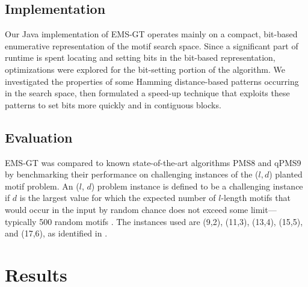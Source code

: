 \documentclass[conference]{IEEEtran}
\begin{document}
	\subsection{Implementation}
		Our Java implementation of EMS-GT operates mainly on a compact, bit-based enumerative representation of the motif search space. Since a significant part of runtime is spent locating and setting bits in the bit-based representation, optimizations were explored for the bit-setting portion of the algorithm. We investigated the properties of some Hamming distance-based patterns occurring in the search space, then formulated a speed-up technique that exploits these patterns to set bits more quickly and in contiguous blocks.

	\subsection{Evaluation}
		EMS-GT was compared to known state-of-the-art algorithms PMS8 and qPMS9 by benchmarking their performance on challenging instances of the ($l, d$) planted motif problem. An ($l$, $d$) problem instance is defined to be a challenging instance if $d$ is the largest value for which the expected number of $l$-length motifs that would occur in the input by random chance does not exceed some limit---typically 500 random motifs \cite{pms2015}. The instances used are (9,2), (11,3), (13,4), (15,5), and (17,6), as identified in \cite{pms2015,pms2007}. 

\section{Results}
\end{document}
